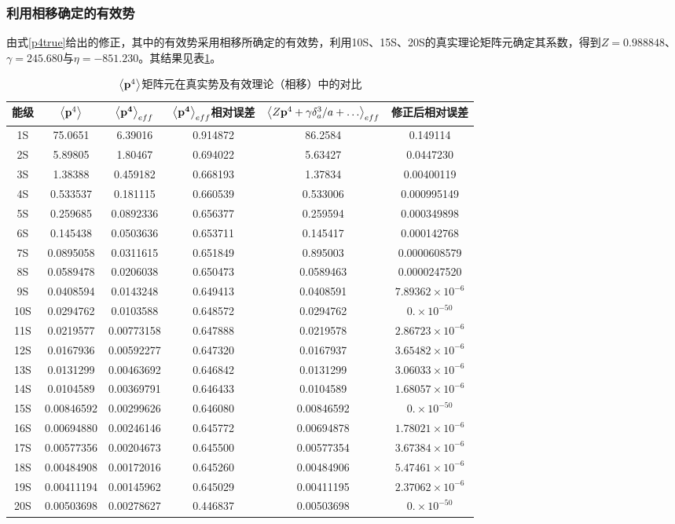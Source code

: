 \documentclass[hyperref,cs4size,titlepage,twoside]{ctexart}
\begin{document}
\subsubsection{利用相移确定的有效势}
由式\eqref{p4true}给出的修正，其中的有效势采用相移所确定的有效势，利用10S、15S、20S的真实理论矩阵元确定其系数，得到$Z=0.988848$、$\gamma=245.680$与$\eta=-851.230$。其结果见表\ref{p41}。
\begin{table}[!hbtp]
  \centering
  \begin{tabular}{|cccccc|}
    \hline
    能级 & $\expval{\vb{p}^4}$ & $\expval{\vb{p^4}}_{eff}$ & $\expval{\vb{p^4}}_{eff}$相对误差 & $\expval{Z\vb{p}^4+\gamma \delta^3_a/a+\dots}_{eff}$ & 修正后相对误差 \\
    \hline
    1S & 75.0651 & 6.39016&0.914872 & 86.2584&0.149114 \\
    2S & 5.89805 & 1.80467&0.694022 & 5.63427&0.0447230 \\
    3S & 1.38388 & 0.459182&0.668193 & 1.37834&0.00400119 \\
    4S & 0.533537 & 0.181115&0.660539 & 0.533006&0.000995149 \\
    5S & 0.259685 & 0.0892336&0.656377 & 0.259594&0.000349898 \\
    6S & 0.145438 & 0.0503636&0.653711 & 0.145417&0.000142768 \\
    7S & 0.0895058 & 0.0311615&0.651849 & 0.895003&0.0000608579 \\
    8S & 0.0589478 & 0.0206038&0.650473 & 0.0589463&0.0000247520 \\
    9S & 0.0408594 & 0.0143248&0.649413 & 0.0408591&$7.89362\times10^{-6}$ \\
    10S& 0.0294762 & 0.0103588 & 0.648572 & 0.0294762 & $0.\times10^{-50}$\\
    11S& 0.0219577 & 0.00773158 & 0.647888 & 0.0219578 & $2.86723\times10^{-6}$\\
    12S& 0.0167936 & 0.00592277 & 0.647320 & 0.0167937 & $3.65482\times10^{-6}$\\
    13S& 0.0131299 & 0.00463692 & 0.646842 & 0.0131299 & $3.06033\times10^{-6}$\\
    14S& 0.0104589 & 0.00369791 & 0.646433 & 0.0104589 & $1.68057\times10^{-6}$\\
    15S& 0.00846592 & 0.00299626 & 0.646080 & 0.00846592 &  $0.\times10^{-50}$\\
    16S& 0.00694880 & 0.00246146 & 0.645772 & 0.00694878 & $1.78021\times10^{-6}$\\
    17S& 0.00577356 & 0.00204673 & 0.645500 & 0.00577354 & $3.67384\times10^{-6}$\\
    18S& 0.00484908 & 0.00172016 & 0.645260 & 0.00484906 & $5.47461\times10^{-6}$\\
    19S& 0.00411194 & 0.00145962 & 0.645029 & 0.00411195 & $2.37062\times10^{-6}$\\
    20S& 0.00503698 & 0.00278627 & 0.446837 & 0.00503698 & $0.\times10^{-50}$\\
    \hline
  \end{tabular}
  \caption{$\expval{\vb{p}^4}$矩阵元在真实势及有效理论（相移）中的对比}\label{p41}
\end{table}
\end{document}
